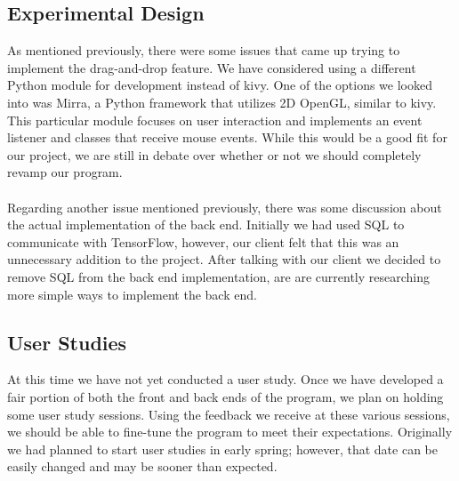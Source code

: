 \documentclass[journal,10pt,onecolumn,compsoc]{IEEEtran} \usepackage[margin=1.0in]{geometry} \usepackage{pdfpages}
\begin{document}
\subsection{Experimental Design} 
\noindent As mentioned previously, there were some issues that came up trying to implement the drag-and-drop feature. We have considered using a different Python module for development instead of kivy. One of the options we looked into was Mirra, a Python framework that utilizes 2D OpenGL, similar to kivy. This particular module focuses on user interaction and implements an event listener and classes that receive mouse events. While this would be a good fit for our project, we are still in debate over whether or not we should completely revamp our program.\\\\
\noindent Regarding another issue mentioned previously, there was some discussion about the actual implementation of the back end. Initially we had used SQL to communicate with TensorFlow\texttrademark, however, our client felt that this was an unnecessary addition to the project. After talking with our client we decided to remove SQL from the back end implementation, are are currently researching more simple ways to implement the back end.
\subsection{User Studies}
\noindent At this time we have not yet conducted a user study. Once we have developed a fair portion of both the front and back ends of the program, we plan on holding some user study sessions. Using the feedback we receive at these various sessions, we should be able to fine-tune the program to meet their expectations. Originally we had planned to start user studies in early spring; however, that date can be easily changed and may be sooner than expected.
\end{document}
